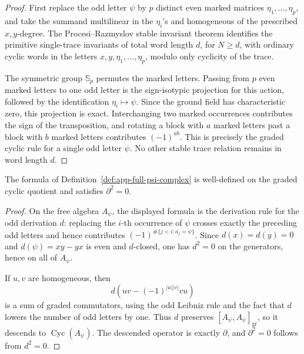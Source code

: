 \begin{proof}
  First replace the odd letter \(\psi\) by \(p\) distinct even marked
  matrices \(\eta_1,\ldots,\eta_p\), and take the summand multilinear in the
  \(\eta_i\)'s and homogeneous of the prescribed \(x,y\)-degree.  The
  Procesi--Razmyslov stable invariant theorem
  \cites{procesi,razmyslov} identifies the primitive single-trace invariants
  of total word length \(d\), for \(N\geq d\), with ordinary cyclic words in
  the letters \(x,y,\eta_1,\ldots,\eta_p\), modulo only cyclicity of the
  trace.

  The symmetric group \(\mathbb S_p\) permutes the marked letters.  Passing
  from \(p\) even marked letters to one odd letter is the sign-isotypic
  projection for this action, followed by the identification
  \(\eta_i\mapsto\psi\).  Since the ground field has characteristic zero, this
  projection is exact.  Interchanging two marked occurrences contributes the
  sign of the transposition, and rotating a block with \(a\) marked letters
  past a block with \(b\) marked letters contributes \((-1)^{ab}\).  This is
  precisely the graded cyclic rule for a single odd letter \(\psi\).  No other
  stable trace relation remains in word length \(d\).
\end{proof}

\begin{lem}[Boundary signs and \(\partial^2=0\)]
\label{lem:app-full-boundary-d2}
  The formula of Definition~\ref{def:app-full-psi-complex} is well-defined on
  the graded cyclic quotient and satisfies \(\partial^2=0\).
\end{lem}

\begin{proof}
  On the free algebra \(A_\psi\), the displayed formula is the derivation
  rule for the odd derivation \(d\): replacing the \(i\)-th occurrence of
  \(\psi\) crosses exactly the preceding odd letters and hence contributes
  \((-1)^{\#\{j<i:a_j=\psi\}}\).  Since \(d(x)=d(y)=0\) and
  \(d(\psi)=xy-yx\) is even and \(d\)-closed, one has \(d^2=0\) on the
  generators, hence on all of \(A_\psi\).

  If \(u,v\) are homogeneous, then
  \[
    d(uv-(-1)^{|u||v|}vu)
  \]
  is a sum of graded commutators, using the odd Leibniz rule and the fact that
  \(d\) lowers the number of odd letters by one.  Thus \(d\) preserves
  \([A_\psi,A_\psi]_{\mathrm{gr}}\), so it descends to
  \(\operatorname{Cyc}(A_\psi)\).  The descended operator is exactly
  \(\partial\), and \(\partial^2=0\) follows from \(d^2=0\).
\end{proof}

